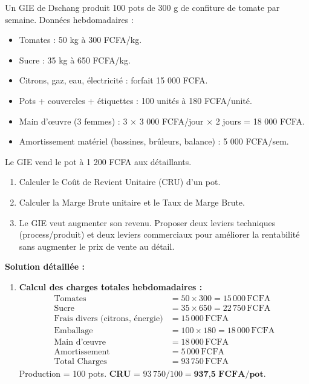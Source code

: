 \documentclass[11pt]{article}
\begin{document}
\begin{exoresolu}
Un GIE de Dschang produit 100 pots de 300 g de confiture de tomate par semaine.
Données hebdomadaires :
\begin{itemize}
    \item Tomates : 50 kg à 300 FCFA/kg.
    \item Sucre : 35 kg à 650 FCFA/kg.
    \item Citrons, gaz, eau, électricité : forfait 15 000 FCFA.
    \item Pots + couvercles + étiquettes : 100 unités à 180 FCFA/unité.
    \item Main d'œuvre (3 femmes) : 3 $\times$ 3 000 FCFA/jour $\times$ 2 jours = 18 000 FCFA.
    \item Amortissement matériel (bassines, brûleurs, balance) : 5 000 FCFA/sem.
\end{itemize}
Le GIE vend le pot à 1 200 FCFA aux détaillants.
\begin{enumerate}
    \item Calculer le Coût de Revient Unitaire (CRU) d'un pot.
    \item Calculer la Marge Brute unitaire et le Taux de Marge Brute.
    \item Le GIE veut augmenter son revenu. Proposer deux leviers techniques (process/produit) et deux leviers commerciaux pour améliorer la rentabilité sans augmenter le prix de vente au détail.
\end{enumerate}
\tcblower
\textbf{Solution détaillée :}
\begin{enumerate}
    \item \textbf{Calcul des charges totales hebdomadaires :}
    \begin{align*}
    \text{Tomates} &= 50 \times 300 = 15\,000\,\text{FCFA} \\
    \text{Sucre} &= 35 \times 650 = 22\,750\,\text{FCFA} \\
    \text{Frais divers (citrons, énergie)} &= 15\,000\,\text{FCFA} \\
    \text{Emballage} &= 100 \times 180 = 18\,000\,\text{FCFA} \\
    \text{Main d'œuvre} &= 18\,000\,\text{FCFA} \\
    \text{Amortissement} &= 5\,000\,\text{FCFA} \\
    \text{Total Charges} &= 93\,750\,\text{FCFA}
    \end{align*}
    Production = 100 pots.
    \textbf{CRU} = $93\,750 / 100 = \textbf{937{,}5 FCFA/pot}$.

\end{enumerate}
\end{exoresolu}
\end{document}
